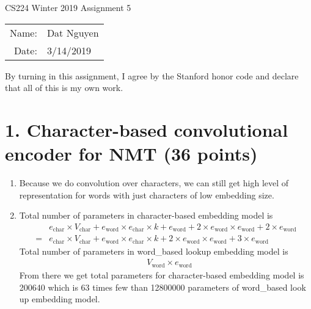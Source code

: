 \documentclass[12pt]{article}
\begin{document}
\begin{center}
{\Large CS224 Winter 2019 Assignment 5}

\begin{tabular}{rl}
Name: & Dat Nguyen \\
Date: & 3/14/2019 \\
\end{tabular}
\end{center}

By turning in this assignment, I agree by the Stanford honor code and declare 
that all of this is my own work.

\section*{1. Character-based convolutional encoder for NMT (36 points)}
\begin{enumerate}[label=(\alph*)]
  \item 
  Because we do convolution over characters, we can still get high level of representation for words with just characters of low embedding size.
  \item
  Total number of parameters in character-based embedding model is
  \begin{align*}
  &e_{\text{char}} \times V_{\text{char}} + e_{\text{word}} \times e_{\text{char}} \times k + e_{\text{word}} +  2 \times e_{\text{word}} \times e_{\text{word}} + 2 \times e_{\text{word}} \\
  =&e_{\text{char}} \times V_{\text{char}} + e_{\text{word}} \times e_{\text{char}} \times k + 2 \times e_{\text{word}} \times e_{\text{word}} + 3 \times e_{\text{word}} 
  \end{align*}
  Total number of parameters in word\_based lookup embedding model is
  \begin{align*}
  &V_{\text{word}} \times e_{\text{word}}
  \end{align*}
  From there we get total parameters for character-based embedding model is 200640 which is 63 times few than 12800000 parameters of word\_based look up embedding model.


\end{enumerate}
\end{document}
